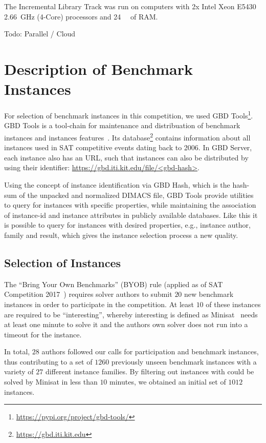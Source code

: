 \documentclass{elsarticle}
\newcommand{\todo}[1]{{\color{purple}Todo: #1}}
\begin{document}
The Incremental Library Track was run on computers with 2x Intel Xeon E5430 \SI{2.66}{\giga\hertz}
(4-Core) processors and \SI{24}{\giga\byte} of RAM.

\todo{Parallel / Cloud}

\section{Description of Benchmark Instances}
\label{sec:instances}

For selection of benchmark instances in this competition, we used GBD Tools\footnote{\url{https://pypi.org/project/gbd-tools/}}. 
GBD Tools is a tool-chain for maintenance and distribuation of benchmark instances and instances features~\cite{Iser:2018:GBD}. 
Its database\footnote{\url{https://gbd.iti.kit.edu}} contains information about all instances used in SAT competitive events dating back to 2006. 
In GBD Server, each instance also has an URL, such that instances can also be distributed by using their identifier: \url{https://gbd.iti.kit.edu/file/<gbd-hash>}.

Using the concept of instance identification via GBD Hash, which is the hash-sum of the unpacked and normalized DIMACS file, GBD Tools provide utilities to query for instances with specific properties, while maintaining the association of instance-id and instance attributes in publicly available databases.
Like this it is possible to query for instances with desired properties, e.g., instance author, family and result, which gives the instance selection process a new quality. 


\subsection{Selection of Instances}

The ``Bring Your Own Benchmarks'' (BYOB) rule (applied as of SAT Competition 2017~\cite{SC2017}) requires solver authors to submit $20$ new benchmark instances in order to participate in the competition. At least $10$ of these instances are required to be ``interesting'', whereby interesting is defined as Minisat~\cite{Niklas:2003:Minisat} needs at least one minute to solve it and the authors own solver does not run into a timeout for the instance. 

In total, $28$ authors followed our calls for participation and benchmark instances, thus contributing to a set of $1260$ previously unseen benchmark instances with a variety of $27$ different instance families. 
By filtering out instances with could be solved by Minisat in less than $10$ minutes, we obtained an initial set of $1012$ instances. 
\end{document}
